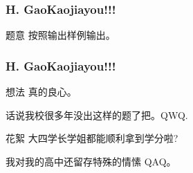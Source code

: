 \renewcommand{\problemname}{H. GaoKaojiayou!!!}

\begin{frame}\frametitle{\problemname}
	
	\begin{block}{题意}
		按照输出样例输出。
	\end{block}
\end{frame}

\begin{frame}\frametitle{\problemname}

	\begin{block}{想法}
		真的良心。

		话说我校很多年没出这样的题了把。QWQ.
	\end{block}

	\begin{block}{花絮}
		大四学长学姐都能顺利拿到学分啦?

		我对我的高中还留存特殊的情愫 QAQ。
	\end{block}
\end{frame}
